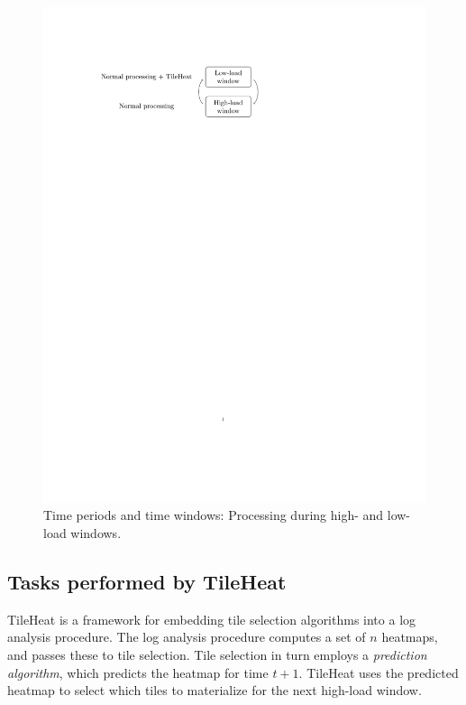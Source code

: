 \documentclass[11pt, oneside]{report}
\begin{document}
{\begin{figure}
\centering
\includegraphics[scale=0.8]{figs-tileheat/figoverview}
\caption{Time periods and time windows: Processing during high- and low-load windows.}
\label{fig:high:low}
\end{figure}


\subsection{Tasks performed by TileHeat}
\label{sec:tileheat:tasks}

TileHeat is a framework for embedding tile selection algorithms into a log analysis procedure. The log analysis procedure computes a set of $n$ heatmaps, and passes these to tile selection. Tile selection in turn employs a \emph{prediction algorithm}, which predicts the heatmap for time $t + 1$. TileHeat uses the predicted heatmap to select which tiles to materialize for the next high-load window. 

}
\end{document}
